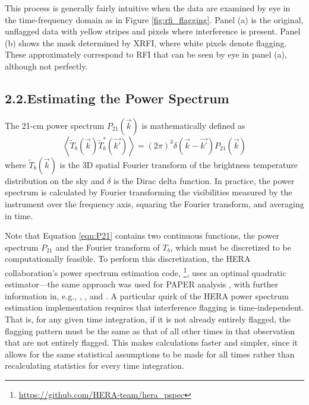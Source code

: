 \documentclass[12pt]{article}
\begin{document}
This process is generally fairly intuitive when the data are examined by eye in the time-frequency domain as in Figure \ref{fig:rfi_flagging}. Panel (a) is the original, unflagged data with yellow stripes and pixels where interference is present. Panel (b) shows the mask determined by XRFI, where white pixels denote flagging. These approximately correspond to RFI that can be seen by eye in panel (a), although not perfectly. \vspace{3mm}

\tocless\subsection{\hypertarget{subsec:pspecestimation}{2.2.\hspace{0.75em}Estimating the Power Spectrum}}

The 21-cm power spectrum $P_{21}\left(\vec{k}\right)$ is mathematically defined as
\begin{equation}
\left\langle \widetilde{T}_b\left(\vec{k}\right) \widetilde{T}_b^*\left(\vec{k'}\right) \right\rangle = \left(2\pi\right)^3 \delta\left(\vec{k} - \vec{k'}\right) P_{21}\left(\vec{k}\right)
\label{eqn:P21}
\end{equation}
where $\widetilde{T}_b\left(\vec{k}\right)$ is the 3D spatial Fourier transform of the brightness temperature distribution on the sky and $\delta$ is the Dirac delta function. In practice, the power spectrum is calculated by Fourier transforming the visibilities measured by the instrument over the frequency axis, squaring the Fourier transform, and averaging in time.

Note that Equation \ref{eqn:P21} contains two continuous functions, the power spectrum $P_{21}$ and the Fourier transform of $T_b$, which must be discretized to be computationally feasible. To perform this discretization, the HERA collaboration's power spectrum estimation code, \herapspec\footnote{\url{https://github.com/HERA-team/hera_pspec}}, uses an optimal quadratic estimator---the same approach was used for PAPER analysis \citep{ali2015}, with further information in, e.g., \cite{tegmark1997}, \cite{tegmark1998}, and \cite{liu2011}. A particular quirk of the HERA power spectrum estimation implementation requires that interference flagging is time-independent. That is, for any given time integration, if it is not already entirely flagged, the flagging pattern must be the same as that of all other times in that observation that are not entirely flagged. This makes calculations faster and simpler, since it allows for the same statistical assumptions to be made for all times rather than recalculating statistics for every time integration.
\end{document}
